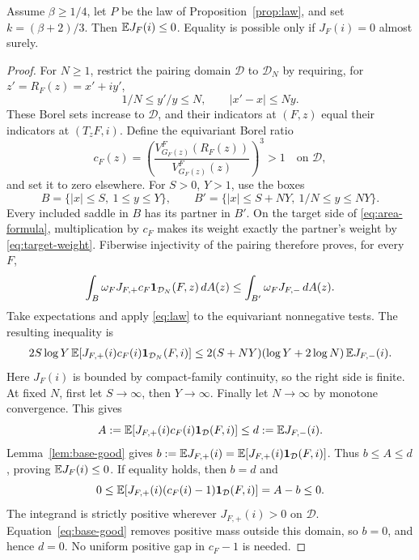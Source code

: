 \begin{proposition}\label{prop:strict-transport}
Assume \(\beta\ge1/4\), let \(P\) be the law of
Proposition~\ref{prop:law}, and set \(k=(\beta+2)/3\).
Then \(\mathbb E J_F(i)\le0\).
Equality is possible only if \(J_F(i)=0\) almost surely.
\end{proposition}
\begin{proof}
For \(N\ge1\), restrict the pairing domain \(\mathcal D\) to
\(\mathcal D_N\) by requiring, for \(z'=R_F(z)=x'+iy'\),
\[
 1/N\le y'/y\le N,\qquad |x'-x|\le Ny.
\]
These Borel sets increase to \(\mathcal D\), and their indicators
at \((F,z)\) equal their indicators at \((T_zF,i)\).
Define the equivariant Borel ratio
\[
 c_F(z)=
 \left(\frac{V_{G_F(z)}^F(R_F(z))}{V_{G_F(z)}^F(z)}\right)^3>1
 \quad\text{on }\mathcal D,
\]
and set it to zero elsewhere.
For \(S>0\), \(Y>1\), use the boxes
\[
 B=\{|x|\le S,\ 1\le y\le Y\},\qquad
 B'=\{|x|\le S+NY,\ 1/N\le y\le NY\}.
\]
Every included saddle in \(B\) has its partner in \(B'\).
On the target side of \eqref{eq:area-formula}, multiplication
by \(c_F\) makes its weight exactly the partner's weight
by \eqref{eq:target-weight}. Fiberwise injectivity of the pairing
therefore proves, for every \(F\),
\[
 \int_B\omega_FJ_{F,+}c_F\mathbf 1_{\mathcal D_N}(F,z)\,dA(z)
 \le\int_{B'}\omega_FJ_{F,-}\,dA(z).
\]
Take expectations and apply \eqref{eq:law} to the equivariant
nonnegative tests. The resulting inequality is
\begin{align*}
 2S\log Y\,
 \mathbb E[J_{F,+}(i)c_F(i)\mathbf 1_{\mathcal D_N}(F,i)]
 \le
 2(S+NY)(\log Y+2\log N)\,\mathbb E J_{F,-}(i).
\end{align*}
Here \(J_F(i)\) is bounded by compact-family continuity, so
the right side is finite. At fixed \(N\), first let \(S\to\infty\),
then \(Y\to\infty\). Finally let \(N\to\infty\) by monotone
convergence. This gives
\[
 A:=\mathbb E[J_{F,+}(i)c_F(i)\mathbf 1_{\mathcal D}(F,i)]
 \le d:=\mathbb E J_{F,-}(i).
\]
Lemma~\ref{lem:base-good} gives
\(b:=\mathbb E J_{F,+}(i)=\mathbb E[J_{F,+}(i)\mathbf 1_{\mathcal D}(F,i)]\).
Thus \(b\le A\le d\), proving \(\mathbb E J_F(i)\le0\).
If equality holds, then \(b=d\) and
\[
 0\le\mathbb E[J_{F,+}(i)(c_F(i)-1)\mathbf 1_{\mathcal D}(F,i)]
 =A-b\le0.
\]
The integrand is strictly positive wherever \(J_{F,+}(i)>0\)
on \(\mathcal D\). Equation~\eqref{eq:base-good} removes positive
mass outside this domain, so \(b=0\), and hence \(d=0\).
No uniform positive gap in \(c_F-1\) is needed.
\end{proof}
